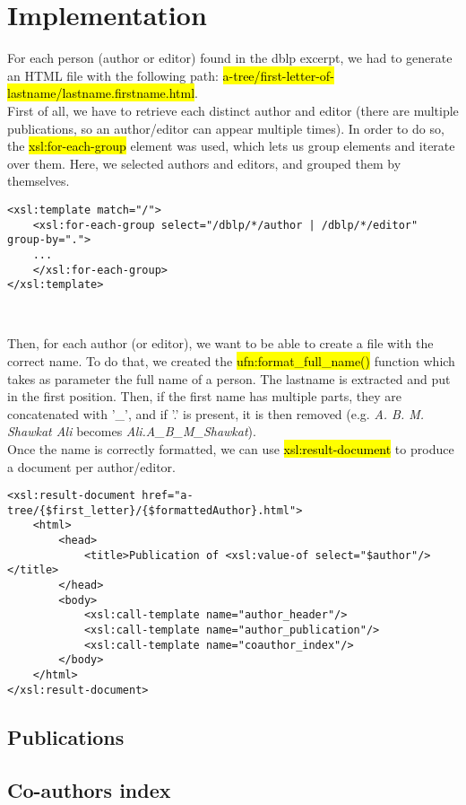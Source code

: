 \section{Implementation}

For each person (author or editor) found in the dblp excerpt, we had to generate
an HTML file with the following path:
\hl{a-tree/first-letter-of-lastname/lastname.firstname.html}.\\

First of all, we have to retrieve each distinct author and editor (there are
multiple publications, so an author/editor can appear multiple times). In order
to do so, the \hl{xsl:for-each-group} element was used, which lets us group
elements and iterate over them. Here, we selected authors and editors, and
grouped them by themselves.\\

\begin{lstlisting}
<xsl:template match="/">
    <xsl:for-each-group select="/dblp/*/author | /dblp/*/editor" group-by=".">
    ...
    </xsl:for-each-group>
</xsl:template>
\end{lstlisting}
\

Then, for each author (or editor), we want to be able to create a file with the
correct name. To do that, we created the \hl{ufn:format\_full\_name()} function
which takes as parameter the full name of a person. The lastname is extracted
and put in the first position. Then, if the first name has multiple parts, they
are concatenated with '\_', and if '.' is present, it is then removed (e.g.
\emph{A. B. M. Shawkat Ali} becomes \emph{Ali.A\_B\_M\_Shawkat}).\\

Once the name is correctly formatted, we can use \hl{xsl:result-document} to
produce a document per author/editor.\\

\begin{lstlisting}
<xsl:result-document href="a-tree/{$first_letter}/{$formattedAuthor}.html">
    <html>
        <head>
            <title>Publication of <xsl:value-of select="$author"/></title>
        </head>
        <body>
            <xsl:call-template name="author_header"/>
            <xsl:call-template name="author_publication"/>
            <xsl:call-template name="coauthor_index"/>
        </body>
    </html>
</xsl:result-document>
\end{lstlisting}

\subsection{Publications}
\newpage

\subsection{Co-authors index}
\newpage
